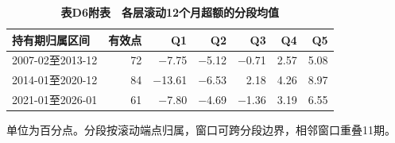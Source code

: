 \begingroup\small\setlength{\tabcolsep}{4pt}
\begin{table}[H]\centering
\caption*{\textbf{表D6附表　各层滚动12个月超额的分段均值}}
\begin{tabular*}{\textwidth}{@{\extracolsep{\fill}}lrrrrrr@{}}\toprule
持有期归属区间 & 有效点 & Q1 & Q2 & Q3 & Q4 & Q5 \\ \midrule
2007-02至2013-12 & 72 & $-$7.75 & $-$5.12 & $-$0.71 & 2.57 & 5.08 \\
2014-01至2020-12 & 84 & $-$13.61 & $-$6.53 & 2.18 & 4.26 & 8.97 \\
2021-01至2026-01 & 61 & $-$7.80 & $-$4.69 & $-$1.36 & 3.19 & 6.55 \\
\bottomrule\end{tabular*}
\par\smallskip\raggedright\footnotesize 单位为百分点。分段按滚动端点归属，窗口可跨分段边界，相邻窗口重叠11期。\end{table}
\endgroup

